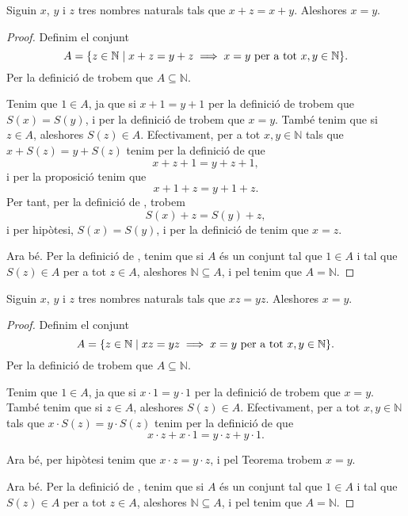 \documentclass[../../Main.tex]{subfiles}
\begin{document}
	\begin{theorem}
		\label{thm:podem tatxar per la suma nombres naturals}
		Siguin \(x\), \(y\) i \(z\) tres nombres naturals tals que \(x+z=x+y\). Aleshores \(x=y\).
		\begin{proof}
			Definim el conjunt
			\[A=\{z\in\mathbb{N}\mid x+z=y+z\implies x=y\text{ per a tot }x,y\in\mathbb{N}\}.\]
			Per la definició de  trobem que \(A\subseteq\mathbb{N}\).
			
			Tenim que \(1\in A\), ja que si \(x+1=y+1\) per la definició de  trobem que \(S(x)=S(y)\), i per la definició de  trobem que \(x=y\). També tenim que si \(z\in A\), aleshores \(S(z)\in A\). Efectivament, per a tot \(x,y\in\mathbb{N}\) tals que \(x+S(z)=y+S(z)\) tenim per la definició de  que
			\[x+z+1=y+z+1,\]
			i per la proposició  tenim que
			\[x+1+z=y+1+z.\]
			Per tant, per la definició de , trobem
			\[S(x)+z=S(y)+z,\]
			i per hipòtesi, \(S(x)=S(y)\), i per la definició de  tenim que \(x=z\).
			
			Ara bé. Per la definició de , tenim que si \(A\) és un conjunt tal que \(1\in A\) i tal que \(S(z)\in A\) per a tot \(z\in A\), aleshores \(\mathbb{N}\subseteq A\), i pel  tenim que \(A=\mathbb{N}\).
		\end{proof}
	\end{theorem}
	\begin{theorem}
		\label{thm:podem tatxar pel producte nombres naturals}
		Siguin \(x\), \(y\) i \(z\) tres nombres naturals tals que \(xz=yz\). Aleshores \(x=y\).
		\begin{proof}
			Definim el conjunt
			\[A=\{z\in\mathbb{N}\mid xz=yz\implies x=y\text{ per a tot }x,y\in\mathbb{N}\}.\]
			Per la definició de  trobem que \(A\subseteq\mathbb{N}\).
			
			Tenim que \(1\in A\), ja que si \(x\cdot1=y\cdot1\) per la definició de  trobem que \(x=y\). També tenim que si \(z\in A\), aleshores \(S(z)\in A\). Efectivament, per a tot \(x,y\in\mathbb{N}\) tals que \(x\cdot S(z)=y\cdot S(z)\) tenim per la definició de \myref{def:producte de nombres naturals} que
			\[x\cdot z+x\cdot1=y\cdot z+y\cdot1.\]
			
			Ara bé, per hipòtesi tenim que \(x\cdot z=y\cdot z\), i pel Teorema  trobem \(x=y\).
			
			Ara bé. Per la definició de , tenim que si \(A\) és un conjunt tal que \(1\in A\) i tal que \(S(z)\in A\) per a tot \(z\in A\), aleshores \(\mathbb{N}\subseteq A\), i pel  tenim que \(A=\mathbb{N}\).
		\end{proof}
	\end{theorem}
\end{document}
